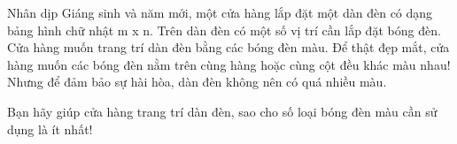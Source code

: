 Nhân dịp Giáng sinh và năm mới, một cửa hàng lắp đặt một dàn đèn có dạng bảng hình chữ nhật m x n. Trên dàn đèn có một số vị trí cần lắp đặt   bóng đèn. Cửa hàng muốn trang trí dàn đèn bằng các bóng đèn màu. Để thật đẹp mắt, cửa hàng muốn các bóng đèn nằm trên cùng hàng hoặc cùng cột   đều khác màu nhau! Nhưng để đảm bảo sự hài hòa, dàn đèn không nên có quá nhiều màu.  

   Bạn hãy giúp cửa hàng trang trí dàn đèn, sao cho số loại bóng đèn màu cần sử dụng là ít nhất!
